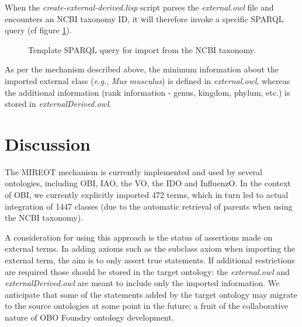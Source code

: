 \documentclass{ao2e}%
\begin{document}
When the \emph{create-external-derived.lisp} script parses the \emph{external.owl} file and encounters an NCBI taxonomy ID, it will therefore invoke a specific SPARQL query (cf figure \ref{fig:sparql2}). 
\begin{figure}[t]
\scriptsize
 
\caption{Template SPARQL query for import from the NCBI taxonomy.}
\label{fig:sparql2}
\end{figure}
As per the mechanism described above, the minimum information about the imported external class (\emph{e.g.}, \emph{Mus musculus}) is defined in \emph{external.owl}, whereas the additional information (rank information - genus, kingdom, phylum, etc.) is stored in \emph{ externalDerived.owl}.%


\section*{Discussion}

The \ac{MIREOT} mechanism is currently  implemented and used by several ontologies, including  \ac{OBI},  \ac{IAO}\cite{IAO}, the \ac{VO}\cite{VO}, the \ac{IDO}\cite{IDO} and  \ac{InfluenzO}\cite{InfluenzO}.
In the context of \ac{OBI}, we currently explicitly imported 472 terms, which in turn led to actual integration of 1447 classes (due to the automatic retrieval of parents when using the NCBI taxonomy). 

A consideration for using this approach is the status of assertions made on external terms.
In adding axioms such as the subclass axiom when importing the external term, the aim is to only assert true statements.
If additional restrictions are required those should be stored in the target ontology: the \emph{external.owl} and \emph{externalDerived.owl} are meant to include only the imported information.
We anticipate that some of the statements added by the target ontology may migrate to the source ontologies at some point in the future; a fruit of the collaborative nature of OBO Foundry ontology development. 
\end{document}
